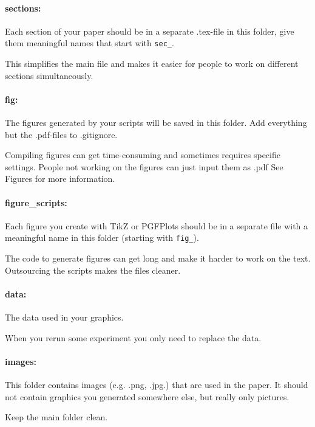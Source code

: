 	\paragraph{sections:} Each section of your paper should be in a separate .tex-file in this folder, give them meaningful names that start with \verb|sec_|.
	
	\begin{whyblock} This simplifies the main file and makes it easier for people to work on different sections simultaneously.\end{whyblock}
	
	\paragraph{fig:} The figures generated by your scripts will be saved in this folder. Add everything but the .pdf-files to .gitignore.
	
	\begin{whyblock} Compiling figures can get time-consuming and sometimes requires specific settings. People not working on the figures can just input them as .pdf See Figures for more information.\end{whyblock}
	
	\paragraph{figure\_scripts:} Each figure you create with TikZ or PGFPlots should be in a separate file with a meaningful name in this folder (starting with \verb|fig_|).
	
	\begin{whyblock} The code to generate figures can get long and make it harder to work on the text. Outsourcing the scripts makes the files cleaner.\end{whyblock}
	
	\paragraph{data:} The data used in your graphics.
	
	\begin{whyblock} When you rerun some experiment you only need to replace the data.\end{whyblock}
	
	\paragraph{images:} This folder contains images (e.g. .png, .jpg.) that are used in the paper. It should not contain graphics you generated somewhere else, but really only pictures.
	
\begin{whyblock} Keep the main folder clean.\end{whyblock}
	
